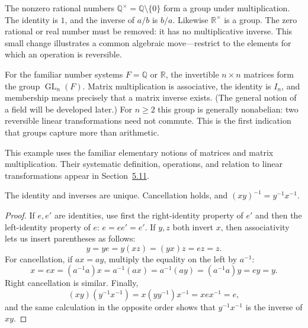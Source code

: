 \begin{example}
The nonzero rational numbers \(\mathbb Q^\times=\mathbb Q\setminus\{0\}\)
form a group under multiplication.  The identity is \(1\), and the inverse of
\(a/b\) is \(b/a\).  Likewise \(\mathbb R^\times\) is a group.  The zero
rational or real number must be removed: it has no multiplicative inverse.
This small change illustrates a common algebraic move---restrict to the
elements for which an operation is reversible.
\end{example}

\begin{example}[Matrices]
For the familiar number systems \(F=\mathbb Q\) or \(\mathbb R\), the
invertible \(n\times n\) matrices form the group \(\operatorname{GL}_n(F)\).
Matrix multiplication is associative, the identity is \(I_n\), and membership
means precisely that a matrix inverse exists.  (The general notion of a field
will be developed later.)  For \(n\geq2\) this group is generally nonabelian:
two reversible linear transformations need not commute.  This is the first
indication that groups capture more than arithmetic.
\end{example}

\begin{remark}
This example uses the familiar elementary notions of matrices and matrix
multiplication. Their systematic definition, operations, and relation to
linear transformations appear in
Section~\hyperref[sec:matrices-change-basis]{5.11}.
\end{remark}

\begin{proposition}
The identity and inverses are unique.  Cancellation holds, and
\((xy)^{-1}=y^{-1}x^{-1}\).
\end{proposition}
\begin{proof}
If \(e,e'\) are identities, use first the right-identity property of \(e'\)
and then the left-identity property of \(e\): \(e=ee'=e'\).  If \(y,z\) both
invert \(x\), then associativity lets us insert parentheses as follows:
\[y=ye=y(xz)=(yx)z=ez=z.\]
For cancellation, if \(ax=ay\), multiply the equality on the left by
\(a^{-1}\):
\[x=ex=(a^{-1}a)x=a^{-1}(ax)=a^{-1}(ay)=(a^{-1}a)y=ey=y.\]
Right cancellation is similar.  Finally,
\[(xy)(y^{-1}x^{-1})=x(yy^{-1})x^{-1}=xex^{-1}=e,\]
and the same calculation in the opposite order shows that \(y^{-1}x^{-1}\)
is the inverse of \(xy\).
\end{proof}

